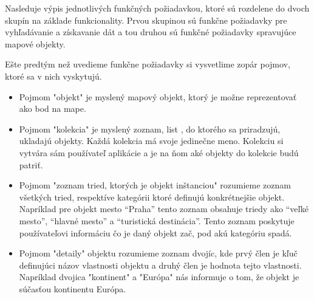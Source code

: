 Nasleduje výpis jednotlivých funkčných požiadavkou, ktoré sú rozdelene do dvoch skupín na základe funkcionality.
Prvou skupinou sú funkčne požiadavky pre vyhľadávanie a získavanie dát a tou druhou sú funkčné požiadavky spravujúce mapové
objekty.

Ešte predtým než uvedieme funkčne požiadavky si vysvetlime zopár pojmov, ktoré sa
v nich vyskytujú.

\begin{itemize}
      \item Pojmom "objekt" je myslený mapový objekt, ktorý je možne reprezentovať ako bod na mape.
      \item Pojmom "kolekcia" je myslený zoznam, list , do ktorého sa priradzujú, ukladajú objekty. Každá kolekcia
            má svoje jedinečne meno. Kolekciu si vytvára sám používateľ aplikácie a je na ňom aké objekty do kolekcie budú patriť.
      \item Pojmom "zoznam tried, ktorých je objekt inštanciou" rozumieme zoznam všetkých tried, respektíve kategórii ktoré definujú konkrétnejšie objekt. Napríklad pre objekt mesto “Praha” tento zoznam
            obsahuje triedy ako “veľké mesto”, “hlavné mesto” a “turistická destinácia”. Tento zoznam poskytuje používateľovi informáciu čo je daný objekt zač, pod akú kategóriu spadá.
      \item Pojmom "detaily" objektu rozumieme zoznam dvojíc, kde prvý člen je kľuč definujúci názov vlastnosti objektu a druhý člen je hodnota tejto vlastnosti.
            Napríklad dvojica "kontinent" a "Európa" nás informuje o tom, že objekt je súčasťou kontinentu Európa.
\end{itemize}

